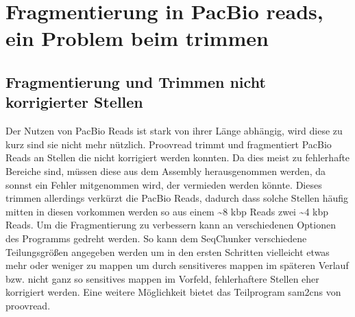 \documentclass{scrartcl}
\begin{document}
\clearpage
\section{Fragmentierung in PacBio reads, ein Problem beim trimmen}
\label{sec-7}
\subsection{Fragmentierung und Trimmen nicht korrigierter Stellen}
\label{sec-7-1}
Der Nutzen von PacBio Reads ist stark von ihrer Länge abhängig, wird diese zu kurz sind sie nicht mehr nützlich. Proovread trimmt und fragmentiert PacBio Reads an
Stellen die nicht korrigiert werden konnten. Da dies meist zu fehlerhafte Bereiche sind, müssen diese aus dem Assembly herausgenommen werden, da 
sonnst ein Fehler mitgenommen wird, der vermieden werden könnte. Dieses trimmen allerdings verkürzt die PacBio Reads, dadurch dass solche Stellen häufig
mitten in diesen vorkommen werden so aus einem \textasciitilde{}8 kbp Reads zwei \textasciitilde{}4 kbp Reads. Um die Fragmentierung zu verbessern kann an verschiedenen Optionen des
Programms gedreht werden. So kann dem SeqChunker verschiedene Teilungsgrößen angegeben werden um in den ersten Schritten vielleicht etwas mehr oder weniger zu 
mappen um durch sensitiveres mappen im späteren Verlauf bzw. nicht ganz so sensitives mappen im Vorfeld, fehlerhaftere Stellen eher korrigiert werden. 
Eine weitere Möglichkeit bietet das Teilprogram sam2cns von proovread. 
\end{document}
